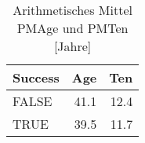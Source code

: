 \begin{table}[H]
	\centering
	\caption{Arithmetisches Mittel PMAge und PMTen [Jahre]}
	\begin{tabular}{lrr}
		\textbf{Success} & \multicolumn{1}{l}{\textbf{Age}} & \multicolumn{1}{l}{\textbf{Ten}} \\\hline
		FALSE & 41.1 & 12.4 \\
		TRUE  & 39.5 & 11.7 \\
	\end{tabular}%
	\label{ageten}%
\end{table}%

